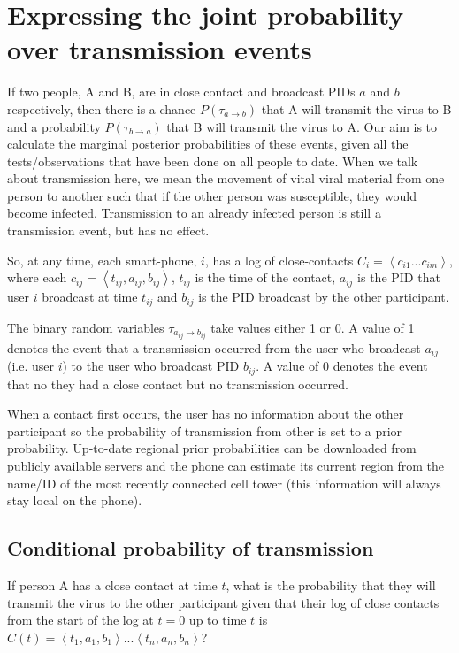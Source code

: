 \documentclass{article}
\begin{document}
\section{Expressing the joint probability over transmission events}

If two people, A and B, are in close contact and broadcast PIDs $a$ and $b$ respectively, then there is a chance $P(\tau_{a \rightarrow b})$ that A will transmit the virus to B and a probability $P(\tau_{b \rightarrow a})$ that B will transmit the virus to A. Our aim is to calculate the marginal posterior probabilities of these events, given all the tests/observations that have been done on all people to date. When we talk about transmission here, we mean the movement of vital viral material from one person to another such that if the other person was susceptible, they would become infected. Transmission to an already infected person is still a transmission event, but has no effect.

So, at any time, each smart-phone, $i$, has a log of close-contacts $C_i = \left<c_{i1}...c_{im}\right>$, where each $c_{ij} = \left<t_{ij}, a_{ij},b_{ij}\right>$, $t_{ij}$ is the time of the contact, $a_{ij}$ is the PID that user $i$ broadcast at time $t_{ij}$ and $b_{ij}$ is the PID broadcast by the other participant.

The binary random variables $\tau_{a_{ij}\rightarrow b_{ij}}$ take values either 1 or 0. A value of 1 denotes the event that a transmission occurred from the user who broadcast $a_{ij}$ (i.e. user $i$) to the user who broadcast PID $b_{ij}$. A value of 0 denotes the event that no they had a close contact but no transmission occurred.

When a contact first occurs, the user has no information about the other participant so the probability of transmission from other is set to a prior probability. Up-to-date regional prior probabilities can be downloaded from publicly available servers and the phone can estimate its current region from the name/ID of the most recently connected cell tower (this information will always stay local on the phone).

\subsection{Conditional probability of transmission}

If person A has a close contact at time $t$, what is the probability that they will transmit the virus to the other participant given that their log of close contacts from the start of the log at $t=0$ up to time $t$ is $C(t) = \left< t_{1},a_1,b_1 \right> ... \left< t_{n},a_n,b_n \right>$?
\end{document}
